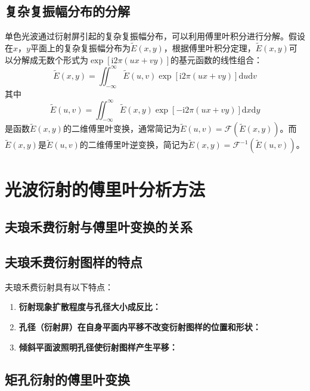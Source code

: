 \documentclass[cn,10pt,chinesefont=founder,math=mtpro2,cite=super,toc=onecol,twoside]{elegantbook}
\begin{document}
\subsection{复杂复振幅分布的分解}

单色光波通过衍射屏引起的复杂复振幅分布，可以利用傅里叶积分进行分解。假设在$x$，$y$平面上的复杂复振幅分布为$\tilde{E}(x,y)$，根据傅里叶积分定理，$\tilde{E}(x,y)$可以分解成无数个形式为$\exp[\mathrm{i}2\pi(ux+vy)]$的基元函数的线性组合：
\begin{equation}
\tilde{E}(x,y)=\iint_{-\infty}^{\infty}\tilde{E}(u,v)\exp[\mathrm{i}2\pi(ux+vy)]\mathrm{d}u\mathrm{d}v
\end{equation}
其中
\begin{equation}
\tilde{E}(u,v)=\iint_{-\infty}^{\infty}\tilde{E}(x,y)\exp[-\mathrm{i}2\pi(ux+vy)]\mathrm{d}x\mathrm{d}y
\end{equation}
是函数$\tilde{E}(x,y)$的二维傅里叶变换，通常简记为$\tilde{E}(u,v)=\mathscr{F}(\tilde{E}(x,y))$。而$\tilde{E}(x,y)$是$\tilde{E}(u,v)$的二维傅里叶逆变换，简记为$\tilde{E}(x,y)=\mathscr{F}^{-1}(\tilde{E}(u,v))$。

\section{光波衍射的傅里叶分析方法}

\subsection{夫琅禾费衍射与傅里叶变换的关系}

\subsection{夫琅禾费衍射图样的特点}
夫琅禾费衍射具有以下特点：
\begin{enumerate}
	\item \textbf{衍射现象扩散程度与孔径大小成反比：}
	\item \textbf{孔径（衍射屏）在自身平面内平移不改变衍射图样的位置和形状：}
	\item \textbf{倾斜平面波照明孔径使衍射图样产生平移：}
\end{enumerate}

\subsection{矩孔衍射的傅里叶变换}
\end{document}
